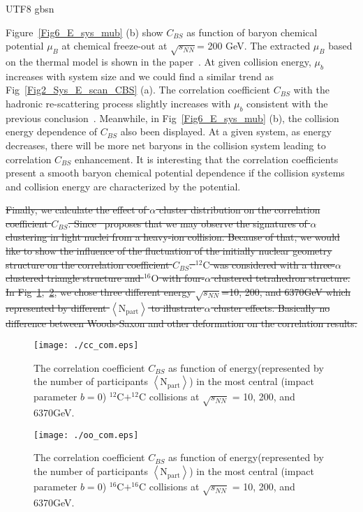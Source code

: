 \documentclass[twocolumn,showpacs,preprintnumbers,superscriptaddress,amsmath,amssymb]{revtex4}
\begin{document}
\begin{CJK*} {UTF8} {gbsn}
	\par
	Figure~\ref{Fig6_E_sys_mub} (b) show $C_{BS}$ as function of baryon chemical potential $\mu_{B}$ at chemical freeze-out at $\sqrt{s_{NN}}$= 200 GeV.
		The extracted $\mu_{B}$ based on the thermal model is shown in the paper~\cite{wdf}.
	At given collision energy, $\mu_{b}$ increases with system size and we could find a similar trend as Fig~\ref{Fig2_Sys_E_scan_CBS} (a).
	The correlation coefficient $C_{BS}$ with the hadronic re-scattering process slightly increases with $\mu_{b}$ consistent with the previous conclusion~\cite{Koch_origin}.
	Meanwhile, in Fig~\ref{Fig6_E_sys_mub} (b), the collision energy dependence of $C_{BS}$ also been displayed.
	At a given system, as energy decreases, there will be more net baryons in the collision system leading to correlation $C_{BS}$ enhancement. It is interesting that the correlation coefficients present a smooth baryon chemical potential dependence if the collision systems and collision energy are characterized by the potential.

	\par 		
	
	\sout{
	Finally, we calculate the effect of $\alpha$ cluster distribution on the correlation coefficient $C_{BS}$.
	Since~\cite{a_cluster_origin} proposes that we may observe the signatures of $\alpha$ clustering in light nuclei from a heavy-ion collision.
	Because of that, we would like to show the influence of the fluctuation of the initially nuclear geometry structure on the correlation coefficient $C_{BS}$.
	$^{12}\mathrm{C}$ was considered with a three-$\alpha$ clustered triangle structure and $^{16}\mathrm{O}$ with four-$\alpha$ clustered tetrahedron structure.	
	In Fig~\ref{Fig7},~\ref{Fig8}, we chose three different energy $\sqrt{s_{NN}}$=10, 200, and 6370GeV which represented by different $\left\langle \mathrm{N_{part}}\right\rangle$
	to illustrate $\alpha$ cluster effects.
	Basically no difference between Woods-Saxon and other deformation on the correlation results.}
	
	
		\begin{figure}[htb]
				\texttt{[image: ./cc\_com.eps]}
				\caption{The correlation coefficient $C_{BS}$ as function of energy(represented by the number of participants $\left\langle \mathrm{N_{part}}\right\rangle$) 
				in the most central (impact parameter $b=0$) $\mathrm{^{12}C+^{12}C}$ collisions at $\sqrt{s_{NN}}$ = 10, 200, and 6370GeV.}
				\label{Fig7}
	\end{figure}
		\begin{figure}[htb]
				\texttt{[image: ./oo\_com.eps]}
				\caption{The correlation coefficient $C_{BS}$ as function of energy(represented by the number of participants $\left\langle \mathrm{N_{part}}\right\rangle$) 
				in the most central (impact parameter $b=0$) $\mathrm{^{16}C+^{16}C}$ collisions at $\sqrt{s_{NN}}$ = 10, 200, and 6370GeV.}
				\label{Fig8}
	\end{figure}
	

\end{CJK*}
\end{document}
